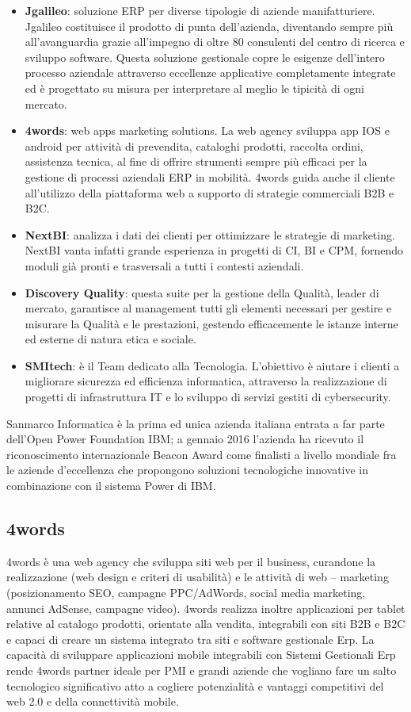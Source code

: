 \begin{itemize}
	\item \textbf{Jgalileo}: soluzione \Gls{ERP} per diverse tipologie di aziende manifatturiere. Jgalileo costituisce il prodotto di punta dell'azienda, diventando sempre più all'avanguardia grazie all'impegno di oltre 80 consulenti del centro di ricerca e sviluppo software. Questa soluzione gestionale copre le esigenze dell'intero processo aziendale attraverso eccellenze applicative completamente integrate ed è progettato su misura per interpretare al meglio le tipicità di ogni mercato.	
	\item \textbf{4words}: web apps marketing solutions. La web agency sviluppa app \gls{IOS} e \Gls{android} per attività di prevendita, cataloghi prodotti, raccolta ordini, assistenza tecnica, al fine di offrire strumenti sempre più efficaci per la gestione di processi aziendali ERP in mobilità. 4words guida anche il cliente all'utilizzo della piattaforma web a supporto di strategie commerciali \Gls{B2B} e \Gls{B2C}.
	\item \textbf{NextBI}: analizza i dati dei clienti per ottimizzare le strategie di marketing. NextBI vanta infatti grande esperienza in progetti di \gls{CI}, \Gls{BI} e \Gls{CPM}, fornendo moduli già pronti e trasversali a tutti i contesti aziendali.
	\item \textbf{Discovery Quality}: questa suite per la gestione della Qualità, leader di mercato, garantisce al management tutti gli elementi necessari per gestire e misurare la Qualità e le prestazioni, gestendo efficacemente le istanze interne ed esterne di natura etica e sociale.
	\item \textbf{SMItech}: è il Team dedicato alla Tecnologia. L'obiettivo è aiutare i clienti a migliorare sicurezza ed efficienza informatica, attraverso la realizzazione di progetti di infrastruttura IT e lo sviluppo di servizi gestiti di \Gls{cybersecurity}.
\end{itemize}
Sanmarco Informatica è la prima ed unica azienda italiana entrata a far parte del\-l'\Gls{Open Power Foundation IBM}; a gennaio 2016 l'azienda ha ricevuto il riconoscimento internazionale \Gls{Beacon Award} come finalisti a livello mondiale fra le aziende d'eccellenza che propongono soluzioni tecnologiche innovative in combinazione con il sistema \Gls{Power} di IBM.

\subsection{4words}
4words è una web agency che sviluppa siti web per il business, curandone la realizzazione (web design e criteri di usabilità) e le attività di web – marketing (posizionamento \Gls{SEO}, campagne \Gls{PPC}/AdWords, social media marketing, annunci AdSense, campagne video).
4words realizza inoltre applicazioni per tablet relative al catalogo prodotti, orientate alla vendita, integrabili con siti B2B e B2C e capaci di creare un sistema integrato tra siti e software gestionale Erp.
La capacità di sviluppare applicazioni mobile integrabili con Sistemi Gestionali Erp rende 4words partner ideale per \Gls{PMI} e grandi aziende che vogliano fare un salto tecnologico significativo atto a cogliere potenzialità e vantaggi competitivi del web 2.0 e della connettività mobile.
